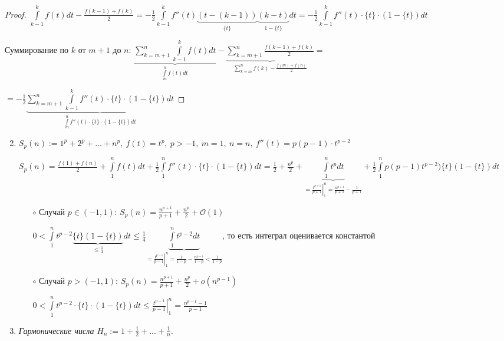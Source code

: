 \begin{proof}
    $\int\limits_{k-1}^k f(t)dt-\frac{f(k-1)+f(k)}{2}
    =-\frac{1}{2}\int\limits_{k-1}^k f''(t)\underbrace{(t-(k-1))}_{\{t\}}\underbrace{(k-t)}_{1-\{t\}}dt
    =-\frac{1}{2}\int\limits_{k-1}^k f''(t)\cdot\{t\}\cdot(1-\{t\})dt$

    Суммирование по $k$ от $m+1$ до $n$: $\underbrace{\sum\limits_{k=m+1}^n\int\limits_{k-1}^k f(t)dt}_{\int\limits_m^n f(t)dt}-\underbrace{\sum\limits_{k=m+1}^n\frac{f(k-1)+f(k)}{2}}_{\sum\limits_{k=m}^nf(k)-\frac{f(m)+f(n)}{2}}=$
    
    $=-\frac{1}{2}\underbrace{\sum\limits_{k=m+1}^n\int\limits_{k-1}^k f''(t)\cdot\{t\}\cdot(1-\{t\})dt}_{\int\limits_{m}^n f''(t)\cdot\{t\}\cdot(1-\{t\})dt}$
\end{proof}

\begin{example}
    \begin{enumerate}
        \item[]
        \item $S_p(n):=1^p+2^p+...+n^p,\ f(t)=t^p,\ p>-1,\ m=1,\ n=n,\ f''(t)=p(p-1)\cdot t^{p-2}$
        
        $S_p(n)=\frac{f(1)+f(n)}{2}+\int\limits_1^nf(t)dt+\frac{1}{2}\int\limits_1^nf''(t)\cdot \{t\}\cdot (1-\{t\})dt
        =\frac{1}{2}+\frac{n^p}{2}+\underbrace{\int\limits_1^nt^pdt}_{=\left.\frac{t^{p+1}}{p+1}\right|_1^n=\frac{n^{p+1}}{p+1}-\frac{1}{p+1}}+\frac{1}{2}\int\limits_1^np(p-1)t^{p-2})\{t\}(1-\{t\})dt$

        \begin{enumerate}
            \item[$\circ$] Случай $p\in (-1, 1)$: $S_p(n)=\frac{n^{p+1}}{p+1}+\frac{n^p}{2}+\mathcal{O}(1)$

            $0<\int\limits_1^nt^{p-2}\underbrace{\{t\}(1-\{t\})}_{\leq \frac{1}{4}}dt\leq \frac{1}{4}\underbrace{\int\limits_1^nt^{p-2}dt}_{=\left.\frac{t^{p-1}}{p-1}\right|_1^n=\frac{1}{1-p}-\frac{n^{p-1}}{1-p}<\frac{1}{1-p}}$, то есть интеграл оценивается константой
            \item[$\circ$] Случай $p > (-1, 1)$: $S_p(n)=\frac{n^{p+1}}{p+1}+\frac{n^p}{2}+o(n^{p-1})$

            $0<\int\limits_1^nt^{p-2}\cdot \{t\}\cdot (1-\{t\})dt\leq \left.\frac{t^{p-1}}{p-1}\right|_1^n=\frac{n^{p-1}-1}{p-1}$
        \end{enumerate}
        
        \item \textit{Гармонические числа} $H_n:=1+\frac{1}{2}+...+\frac{1}{n}$.


\end{enumerate}
\end{example}
